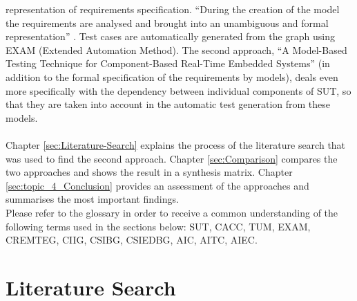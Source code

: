 representation of requirements specification. \enquote{During
the creation of the model the requirements are analysed and brought
into an unambiguous and formal representation} \cite{Siegl2010}.
Test cases are automatically generated from the graph using EXAM (Extended
Automation Method). The second approach, \enquote{A Model-Based
Testing Technique for Component-Based Real-Time Embedded Systems}
(in addition to the formal specification of the requirements by models),
deals even more specifically with the dependency between individual
components of SUT, so that they are taken into account in the automatic
test generation from these models.\\
 \\
Chapter \autoref{sec:Literature-Search} explains the process of the literature
search that was used to find the second approach. Chapter \autoref{sec:Comparison}
compares the two approaches and shows the result in a synthesis matrix.
Chapter \autoref{sec:topic_4_Conclusion} provides an assessment of the approaches
and summarises the most important findings.\\
Please refer to the glossary in order to receive a common understanding of the following terms used in the sections below: SUT, CACC, TUM, EXAM, CREMTEG, CIIG, CSIBG, CSIEDBG, AIC, AITC, AIEC.

\section{Literature Search\label{sec:Literature-Search}}

